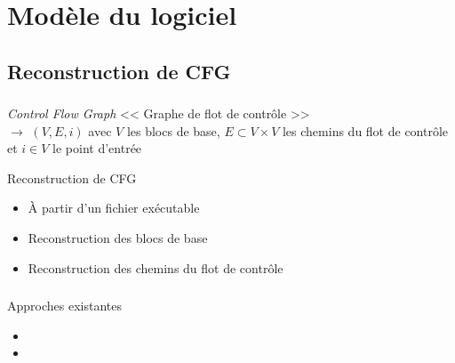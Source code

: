 \documentclass{beamer}
\begin{document}
  \section{Modèle du logiciel}
  \subsection{Reconstruction de CFG}
  \begin{frame}
    \frametitle{\secname}
    \framesubtitle{\subsecname}

    \begin{block}{\textit{Control Flow Graph}}
      << Graphe de flot de contrôle >> \\
      $\rightarrow$ $(V,E,i)$ avec $V$ les blocs de base, $E \subset V \times V$
      les chemins du flot de contrôle et $i \in V$ le point d'entrée
    \end{block}

    \begin{block}{Reconstruction de CFG}
      \begin{itemize}
        \item À partir d'un fichier exécutable
        \item Reconstruction des blocs de base
        \item Reconstruction des chemins du flot de contrôle
      \end{itemize}
    \end{block}
  \end{frame}

  \begin{frame}
    \frametitle{\secname}
    \framesubtitle{\subsecname}

    \begin{exampleblock}{Approches existantes}
      \tiny
      \begin{itemize}
        \item {}
        \item {}
      \end{itemize}
    \end{exampleblock}
  \end{frame}
\end{document}
